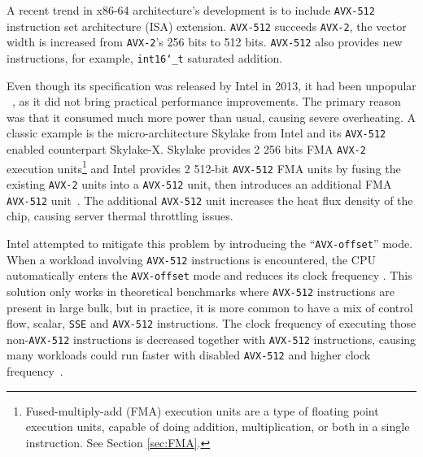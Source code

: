 \documentclass[logo,bsc,singlespacing,parskip]{infthesis}
\newcommand{\dtshort}{\texttt{int16\char`_t}}
\newcommand{\hlc}[2][yellow]{{%
    \colorlet{foo}{#1}%
    \sethlcolor{foo}\hl{#2}}%
}
\begin{document}
A recent trend in x86-64 architecture’s development is to include \texttt{AVX-512}
instruction set architecture (ISA) extension. \texttt{AVX-512} succeeds \texttt{AVX-2}, the vector
width is increased from \texttt{AVX-2}’s 256 bits to 512 bits. \texttt{AVX-512} also provides new
instructions, for example, \dtshort{} saturated addition.


Even though its specification was released by Intel in 2013, it had been
unpopular ~\cite{linusHopeAvx512Die}, as it did not bring practical performance
improvements. The primary reason was that it consumed much more power than
usual, causing severe overheating. A classic example is the micro-architecture
Skylake from Intel and its \texttt{AVX-512} enabled counterpart Skylake-X.
Skylake provides 2 256 bits FMA \texttt{AVX-2} execution
units\footnote{Fused-multiply-add (FMA) execution units are a type of floating
point execution units, capable of doing addition, multiplication, or both in a
single instruction. See Section \ref{sec:FMA}.} and Intel provides 2 512-bit
\texttt{AVX-512} FMA units by fusing the existing \texttt{AVX-2}  units into a
\texttt{AVX-512} unit, then introduces an additional FMA \texttt{AVX-512}
unit~\cite{SLK-X}. The additional \texttt{AVX-512} unit increases the heat flux
density of the chip, causing server thermal throttling issues. 

Intel attempted to mitigate this problem by introducing the
``\texttt{AVX-offset}'' mode. When a workload involving \texttt{AVX-512}
instructions is encountered, the CPU automatically enters the
\texttt{AVX-offset} mode and reduces its clock frequency \cite{AVX-offset}. This
solution only works in theoretical benchmarks where \texttt{AVX-512}
instructions are present in large bulk, but in practice, it is more common to have a
mix of control flow, scalar, \texttt{SSE} and \texttt{AVX-512} instructions. The
clock frequency of executing those non-\texttt{AVX-512} instructions is
decreased together with \texttt{AVX-512} instructions, causing many workloads
could run faster with disabled \texttt{AVX-512} and higher clock
frequency~\cite{Zen4Critique}. 

\end{document}
